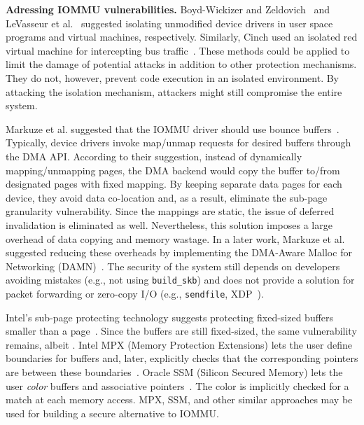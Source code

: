 \DIFaddend \smallskip
\noindent\textbf{Adressing IOMMU vulnerabilities.}
Boyd-Wickizer and Zeldovich~\cite{BWZ10} and LeVasseur et al.~\cite{LUSG04} suggested isolating unmodified device drivers in user space programs and virtual machines, respectively. Similarly, Cinch used an isolated red virtual machine for intercepting bus traffic~\cite{AWH16}. These methods could be applied to limit the damage of potential attacks in addition to other protection mechanisms. They do not, however, prevent code execution in an isolated environment. By attacking the isolation mechanism, attackers might still compromise the entire system.

Markuze et al. suggested that the IOMMU driver should use bounce buffers~\cite{MMT16}. Typically, device drivers invoke map/unmap requests for desired buffers through the DMA API. According to their suggestion, instead of dynamically mapping/unmapping pages, the DMA backend would copy the buffer to/from designated pages with fixed mapping. By keeping separate data pages for each device, they avoid data co-location and, as a result, eliminate the sub-page granularity vulnerability. Since the mappings are static, the issue of deferred invalidation is eliminated as well. 
%
Nevertheless, this solution imposes a large overhead of data copying and memory wastage. In a later work, Markuze et al. suggested reducing these overheads by implementing the DMA-Aware Malloc for Networking (DAMN)~\cite{MSMT18}. The security of the system still depends on developers avoiding mistakes (e.g., not using \texttt{build\_skb}) and does not provide a solution for packet forwarding or zero-copy I/O (e.g., \texttt{sendfile}, XDP~\cite{xdp}). %

Intel’s sub-page protecting technology suggests protecting fixed-sized buffers smaller than a page~\cite{Int18}. Since the buffers are still fixed-sized, the same vulnerability remains, albeit \DIFdelbegin {}\DIFdelend \DIFaddbegin {}\DIFaddend . Intel MPX (Memory Protection Extensions) lets the user define boundaries for buffers and, later, explicitly checks that the corresponding pointers are between these boundaries~\cite{Int16a}. Oracle SSM (Silicon Secured Memory) lets the user \emph{color} buffers and associative pointers~\cite{Ora15}. The color is implicitly checked for a match at each memory access. MPX, SSM, and other similar approaches may be used for building a secure alternative to IOMMU. 

